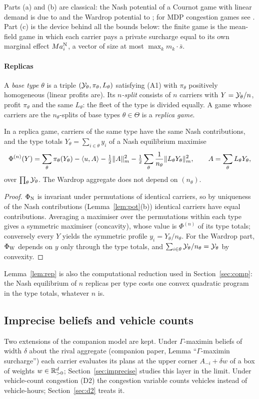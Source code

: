 Parts (a) and (b) are classical: the Nash potential of a Cournot game with linear demand is due to \citet{Slade1994} and the Wardrop potential to \citet{Beckmann1956}; for MDP congestion games see \citet{CalderoneSastry2017}. Part (c) is the device behind all the bounds below: the finite game is the mean-field game in which each carrier pays a private surcharge equal to its own marginal effect $Ma_i^{\mathrm{N}}$, a vector of size at most $\max_km_k\cdot\bar s$.

\paragraph{Replicas} A \emph{base type} $\theta$ is a triple $(\mathcal{Y}_\theta,\pi_\theta,L_\theta)$ satisfying (A1) with $\pi_\theta$ positively homogeneous (linear profits are). Its \emph{$n$-split} consists of $n$ carriers with $Y=\mathcal{Y}_\theta/n$, profit $\pi_\theta$ and the same $L_\theta$: the fleet of the type is divided equally. A game whose carriers are the $n_\theta$-splits of base types $\theta\in\Theta$ is a \emph{replica game}.

\begin{lemma}\label{lem:rep}
In a replica game, carriers of the same type have the same Nash contributions, and the type totals $Y_\theta=\sum_{i\in\theta}y_i$ of a Nash equilibrium maximise
\[
\Phi^{(n)}(Y)=\sum_\theta\pi_\theta(Y_\theta)-\langle u,A\rangle-\tfrac12\lVert A\rVert_m^2-\tfrac12\sum_\theta\frac{1}{n_\theta}\lVert L_\theta Y_\theta\rVert_m^2,\qquad A=\sum_\theta L_\theta Y_\theta,
\]
over $\prod_\theta\mathcal{Y}_\theta$. The Wardrop aggregate does not depend on $(n_\theta)$.
\end{lemma}
\begin{proof}
$\Phi_{\mathrm{N}}$ is invariant under permutations of identical carriers, so by uniqueness of the Nash contributions (Lemma~\ref{lem:pot}(b)) identical carriers have equal contributions. Averaging a maximiser over the permutations within each type gives a symmetric maximiser (concavity), whose value is $\Phi^{(n)}$ of its type totals; conversely every $Y$ yields the symmetric profile $y_i=Y_\theta/n_\theta$. For the Wardrop part, $\Phi_{\mathrm{W}}$ depends on $y$ only through the type totals, and $\sum_{i\in\theta}\mathcal{Y}_\theta/n_\theta=\mathcal{Y}_\theta$ by convexity.
\end{proof}

Lemma~\ref{lem:rep} is also the computational reduction used in Section~\ref{sec:comp}: the Nash equilibrium of $n$ replicas per type costs one convex quadratic program in the type totals, whatever $n$ is.

\subsection{Imprecise beliefs and vehicle counts}
Two extensions of the companion model are kept. Under $\Gamma$-maximin beliefs of width $\delta$ about the rival aggregate (companion paper, Lemma ``$\Gamma$-maximin surcharge'') each carrier evaluates its plans at the upper corner $A_{-i}+\delta w$ of a box of weights $w\in\mathbb{R}^d_{>0}$; Section~\ref{sec:imprecise} studies this layer in the limit. Under vehicle-count congestion (D2) the congestion variable counts vehicles instead of vehicle-hours; Section~\ref{sec:d2} treats it.
